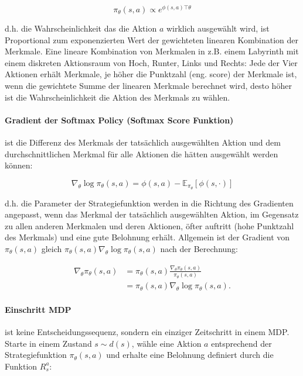 \documentclass[conference]{IEEEtran}
\begin{document}
\begin{equation*}
\pi_\theta(s,a) \propto e^{\phi(s,a) \top \theta}
\end{equation*}

d.h. die Wahrscheinlichkeit das die Aktion $a$ wirklich ausgewählt wird, ist Proportional zum exponenzierten Wert der gewichteten linearen Kombination der Merkmale. Eine lineare Kombination von Merkmalen in z.B. einem Labyrinth mit einem diskreten Aktionsraum von Hoch, Runter, Links und Rechts: Jede der Vier Aktionen erhält Merkmale, je höher die Punktzahl (eng. score) der Merkmale ist, wenn die gewichtete Summe der linearen Merkmale berechnet wird, desto höher ist die Wahrscheinlichkeit die Aktion des Merkmals zu wählen.

\paragraph*{Gradient der Softmax Policy (Softmax Score Funktion)} ist die Differenz des Merkmals der tatsächlich ausgewählten Aktion und dem durchschnittlichen Merkmal für alle Aktionen die hätten ausgewählt werden können: 

\begin{equation*}
\nabla_\theta \log \pi_\theta (s,a) = \phi(s,a) - \mathbb{E}_{\pi_\theta}[\phi(s, \cdot)]
\end{equation*}

d.h. die Parameter der Strategiefunktion werden in die Richtung des Gradienten angepasst, wenn das Merkmal der tatsächlich ausgewählten Aktion, im Gegensatz zu allen anderen Merkmalen und deren Aktionen, öfter auftritt (hohe Punktzahl des Merkmals) und eine gute Belohnung erhält. Allgemein ist der Gradient von $\pi_\theta (s,a)$ gleich $\pi_\theta (s,a) \nabla_\theta \log \pi_\theta (s,a)$ nach der Berechnung:

\begin{equation*}
\begin{aligned}
\nabla_\theta \pi_\theta (s,a) & = \pi_\theta (s,a) \frac{\nabla_\theta \pi_\theta (s,a)}{\pi_\theta (s,a)} \\
& = \pi_\theta (s,a) \nabla_\theta \log \pi_\theta (s,a).
\end{aligned}
\end{equation*}

\paragraph*{Einschritt MDP} ist keine Entscheidungssequenz, sondern ein einziger Zeitschritt in einem MDP. Starte in einem Zustand $s \sim d(s)$, wähle eine Aktion $a$ entsprechend der Strategiefunktion $\pi_\theta(s,a)$ und erhalte eine Belohnung definiert durch die Funktion $R^a_s$:
\end{document}
